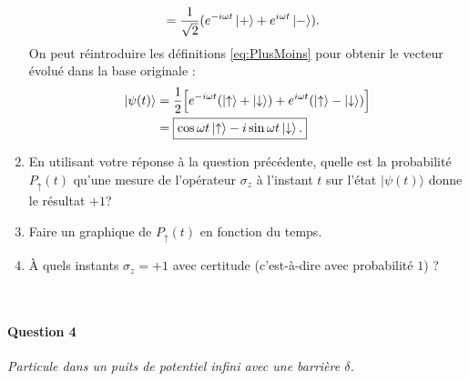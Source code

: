 \begin{enumerate}
{\begin{equation}
\begin{split}
&= \frac{1}{\sqrt{2}} (e^{-i\omega t} \ket{+} + e^{i\omega t} \ket{-}).
\end{split}
\end{equation}
On peut réintroduire les définitions \eqref{eq:PlusMoins} pour obtenir le vecteur évolué dans la base originale :
\begin{equation}
\begin{split}
\ket{\psi(t)} &= \frac{1}{2} \Big[  e^{-i\omega t} (\ket{\uparrow}+\ket{\downarrow}) + e^{i\omega t} (\ket{\uparrow}-\ket{\downarrow})  \Big] \\
&= \boxed { \cos \omega t \ket{\uparrow} - i \sin \omega t \ket{\downarrow}. }
\end{split}
\end{equation}
}

\item
En utilisant votre réponse à la question précédente, quelle est la probabilité $P_\uparrow(t)$ qu'une mesure de l'opérateur $\sigma_z$ à l'instant $t$ sur  l'état $\vert \psi(t)\rangle$ donne le résultat $+1$?
\\ 




\item Faire un graphique de $P_\uparrow(t)$ en fonction du temps.
\\

\item À quels instants $\sigma_z=+1$ avec certitude (c'est-à-dire avec probabilité $1$) ? \\



\end{enumerate}


\newpage

\
\newpage
\
\newpage
 

\paragraph{Question 4} \textit{Particule dans un puits de potentiel infini avec une barrière $\delta$.} \\

